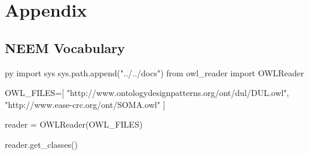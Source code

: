 \chapter{Appendix}
\label{app:complete_pub_list}

\section{NEEM Vocabulary}
\label{appendix:section1}
\pagestyle{fancy} 
\newcommand{\appendixstyle}[2]{\textbf{#1}\markboth{#1}{#1}\ {#2}}

\begin{pythontexcustomcode}{py}
import sys
sys.path.append("../../docs")
from owl_reader import OWLReader

OWL_FILES=[
    "http://www.ontologydesignpatterns.org/ont/dul/DUL.owl",
    "http://www.ease-crc.org/ont/SOMA.owl"
]

reader = OWLReader(OWL_FILES)
\end{pythontexcustomcode}

\begin{multicols}{2}

\begin{pycode}
reader.get_classes()
\end{pycode}

\end{multicols}
